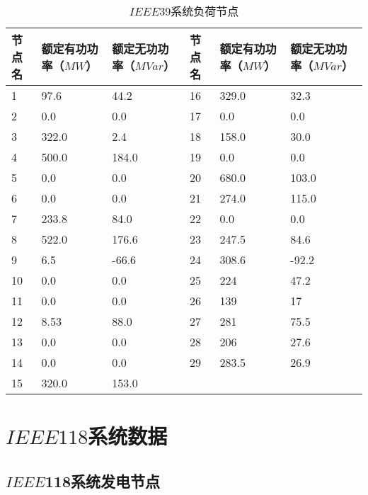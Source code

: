 \begin{table}[H]
  \centering
  \caption{$IEEE$39系统负荷节点}
  \label{tab:chap5:load39}
    \begin{tabular}{C{1.2cm}C{2.4cm}C{2.4cm}C{1.2cm}C{2.4cm}C{2.4cm}}
\toprule
            \textbf{节点名}        &\textbf{额定有功功率（$MW$）}      &\textbf{额定无功功率（$MVar$）}   & \textbf{节点名}        &\textbf{额定有功功率（$MW$）}      &\textbf{额定无功功率（$MVar$）}       \\
        &97.6 &44.2 & 16        &329.0 &32.3\\
            2        &0.0 &0.0 &17        &0.0 &0.0\\
            3        &322.0  &2.4 &18        &158.0 &30.0\\
            4        &500.0  &184.0 &19        &0.0 &0.0\\
            5        &0.0 &0.0 &20        &680.0 &103.0\\
            6       &0.0 &0.0 &21        &274.0 &115.0\\
            7        &233.8 &84.0 &22        &0.0 &0.0\\
            8        &522.0 &176.6 &23        &247.5 &84.6\\
            9        &6.5 &-66.6 &24        &308.6 &-92.2\\
            10        &0.0 &0.0 &25        &224 &47.2\\
            11        &0.0 &0.0 &26        &139 &17\\
            12        &8.53 &88.0 &27        &281 &75.5\\
            13        &0.0 &0.0 &28        &206 &27.6\\
            14        &0.0 &0.0 &29        &283.5 &26.9\\
            15        &320.0 &153.0 & & &\\
\bottomrule
\end{tabular}
\end{table}

\chapter{$IEEE118$系统数据}
\label{cha:engorg}

\section{$IEEE$118系统发电节点}
\label{sec:lp}

